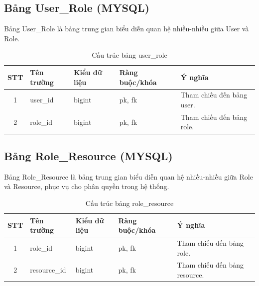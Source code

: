 \documentclass[../DoAn.tex]{subfiles}
\begin{document}
\subsection{Bảng User\_Role (MYSQL)}
Bảng User\_Role là bảng trung gian biểu diễn quan hệ nhiều-nhiều giữa User và Role.
\begin{table}[htbp]
    \centering
    \small
    \renewcommand{\arraystretch}{1.3}
    \label{tab:userrole-structure}
    \begin{tabularx}{\textwidth}{|c|l|l|l|>{\raggedright\arraybackslash}X|}
        \hline
        \textbf{STT} & \textbf{Tên trường} & \textbf{Kiểu dữ liệu} & \textbf{Ràng buộc/khóa} & \textbf{Ý nghĩa}          \\
        \hline
        1            & user\_id            & bigint                & pk, fk                  & Tham chiếu đến bảng user. \\
        \hline
        2            & role\_id            & bigint                & pk, fk                  & Tham chiếu đến bảng role. \\
        \hline
    \end{tabularx}
    \caption{Cấu trúc bảng user\_role}
\end{table}

\subsection{Bảng Role\_Resource (MYSQL)}
Bảng Role\_Resource là bảng trung gian biểu diễn quan hệ nhiều-nhiều giữa Role và Resource, phục vụ cho phân quyền trong hệ thống.
\begin{table}[htbp]
    \centering
    \small
    \renewcommand{\arraystretch}{1.3}
    \label{tab:roleresource-structure}
    \begin{tabularx}{\textwidth}{|c|l|l|l|>{\raggedright\arraybackslash}X|}
        \hline
        \textbf{STT} & \textbf{Tên trường} & \textbf{Kiểu dữ liệu} & \textbf{Ràng buộc/khóa} & \textbf{Ý nghĩa}              \\
        \hline
        1            & role\_id            & bigint                & pk, fk                  & Tham chiếu đến bảng role.     \\
        \hline
        2            & resource\_id        & bigint                & pk, fk                  & Tham chiếu đến bảng resource. \\
        \hline
    \end{tabularx}
    \caption{Cấu trúc bảng role\_resource}
\end{table}
\clearpage
\end{document}
